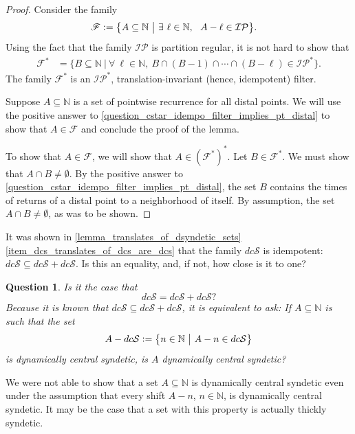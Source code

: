 \documentclass[letter,11pt]{article}
\theoremstyle{plain}
\newtheorem{question}[theorem]{Question}
\theoremstyle{definition}
\theoremstyle{plain}
\theoremstyle{plain}
\numberwithin{equation}{section}
\newcommand{\N}{\mathbb{N}}
\newcommand{\defeq}{\vcentcolon=}
\newcommand{\dcsyndetic}{dc\mathcal{S}}
\newcommand{\IP}{\mathcal{IP}}
\newcommand{\class}{\mathscr{F}}
\begin{document}
\begin{proof}
    Consider the family
    \begin{align*}
        \class &\defeq \big\{ A \subseteq \N \ \big | \ \exists \ \ell \in \N, \ \ A-\ell \in \IP \big\}.
    \end{align*}
    Using the fact that the family $\IP$ is partition regular, it is not hard to show that
    \begin{align*}
        \class^* &= \big\{ B \subseteq \N \ \big | \ \forall \ \ell \in \N, \ B \cap (B-1) \cap \cdots \cap (B-\ell) \in \IP^* \big\}.
    \end{align*}
    The family $\class^*$ is an $\IP^*$, translation-invariant (hence, idempotent) filter.

    Suppose $A \subseteq \N$ is a set of pointwise recurrence for all distal points.  We will use the positive answer to \cref{question_cstar_idempo_filter_implies_pt_distal} to show that $A \in \class$ and conclude the proof of the lemma.

    To show that $A \in \class$, we will show that $A \in (\class^*)^*$.  Let $B \in \class^*$.  We must show that $A \cap B \neq \emptyset$.  By the positive answer to \cref{question_cstar_idempo_filter_implies_pt_distal}, the set $B$ contains the times of returns of a distal point to a neighborhood of itself.  By assumption, the set $A \cap B \neq \emptyset$, as was to be shown.
\end{proof}

It was shown in \cref{lemma_translates_of_dsyndetic_sets} \eqref{item_dcs_translates_of_dcs_are_dcs} that the family $\dcsyndetic$ is idempotent: $\dcsyndetic \subseteq \dcsyndetic + \dcsyndetic$.  Is this an equality, and, if not, how close is it to one?

\begin{question}
\label{quest_is_dcs_plus_dcs_equal_to_dcs}
    Is it the case that
    \[\dcsyndetic = \dcsyndetic + \dcsyndetic?\]
    Because it is known that $\dcsyndetic \subseteq \dcsyndetic + \dcsyndetic$, it is equivalent to ask: If $A \subseteq \N$ is such that the set
    \[A - \dcsyndetic \defeq \big\{ n \in \N \ \big | \ A - n \in \dcsyndetic \big\}\]
    is dynamically central syndetic, is $A$ dynamically central syndetic?    
\end{question}

We were not able to show that a set $A \subseteq \N$ is dynamically central syndetic even under the assumption that every shift $A - n$, $n \in \N$, is dynamically central syndetic.  It may be the case that a set with this property is actually thickly syndetic.
\end{document}
